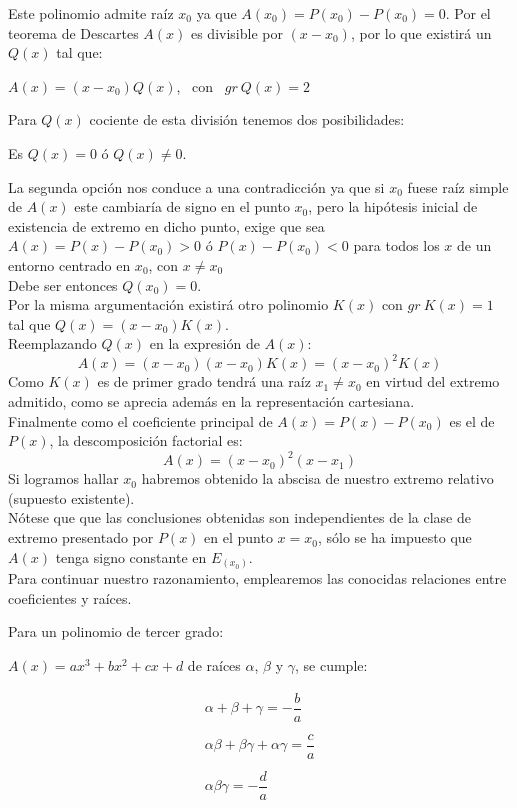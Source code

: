 \documentclass[12pt]{article}
\begin{document}
Este polinomio admite raíz ${x}_0$ ya que $A({x}_0) = P({x}_0) - P({x}_0) = 0$. Por el teorema de Descartes $A(x)$ es divisible por $(x - {x}_0)$, por lo que existirá un $Q(x)$ tal que:

\begin{center}
  $A(x) = (x - {x}_0) Q(x)$, \ con \ $gr \ Q(x) = 2$
\end{center}
\clearpage

Para $Q(x)$ cociente de esta división tenemos dos posibilidades:
\begin{center}
  Es $Q(x)=0$ ó $Q(x) \neq 0$.
\end{center}

La segunda opción nos conduce a una contradicción ya que si ${x}_0$ fuese raíz simple de $A(x)$ este cambiaría de signo en el punto ${x}_0$, pero la hipótesis inicial de existencia de extremo en dicho punto, exige que sea $A(x) = P(x) - P({x}_0) > 0$ ó $P(x) - P({x}_0) < 0$ para todos los $x$ de un entorno centrado en ${x}_0$, con $x \neq {x}_0$ \\
Debe ser entonces $Q({x}_0)=0$. \\
Por la misma argumentación existirá otro polinomio $K(x)$ con $gr \ K(x)=1$ tal que $Q(x)=(x-{x}_0)K(x)$. \\
Reemplazando $Q(x)$ en la expresión de $A(x)$:
$$
  A(x)=(x-{x}_0)(x-{x}_0)K(x)=(x-{x}_0)^2 K(x)
$$
Como $K(x)$ es de primer grado tendrá una raíz ${x}_1 \neq {x}_0$ en virtud del extremo admitido, como se aprecia además en la representación cartesiana. \\
Finalmente como el coeficiente principal de $A(x) = P(x) - P({x}_0)$ es el de $P(x)$, la descomposición factorial es:
$$
  A(x)= (x-{x}_0)^2 (x-{x}_1)
$$
Si logramos hallar ${x}_0$ habremos obtenido la abscisa de nuestro extremo relativo (supuesto existente). \\
Nótese que que las conclusiones obtenidas son independientes de la clase de extremo presentado por $P(x)$ en el punto $x={x}_0$, sólo se ha impuesto que $A(x)$ tenga signo constante en ${E}_({x}_0)$. \\
Para continuar nuestro razonamiento, emplearemos las conocidas relaciones entre coeficientes y raíces.

Para un polinomio de tercer grado:
\begin{center}
  $A(x)=ax^3+bx^2+cx+d$ de raíces $\alpha$, $\beta$ y $\gamma$, se cumple:
\end{center}
$$
  \begin{array}{l}
    \alpha + \beta + \gamma = -\dfrac{b}{a}                 \\
    \\
    \alpha\beta + \beta\gamma + \alpha\gamma = \dfrac{c}{a} \\
    \\
    \alpha\beta\gamma   = -\dfrac{d}{a}
  \end{array}
$$
\end{document}
